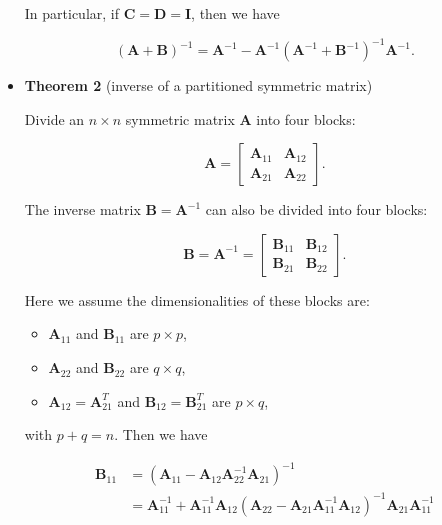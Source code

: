 \documentclass[10pt,b5paper,titlepage]{book}
\begin{document}
\begin{itemize}
        In particular, if $\mathbf{C} = \mathbf{D} = \mathbf{I}$, then we have

        \begin{equation}
            (\mathbf{A} + \mathbf{B})^{-1} = \mathbf{A}^{-1} - \mathbf{A}^{-1} (\mathbf{A}^{-1} + \mathbf{B}^{-1})^{-1} \mathbf{A}^{-1}
        .\end{equation}

    \item \textbf{Theorem 2} (inverse of a partitioned symmetric matrix)

        Divide an $n \times n$ symmetric matrix $\mathbf{A}$ into four blocks:

        \begin{equation}
            \mathbf{A} = \begin{bmatrix}
                \mathbf{A}_{11} & \mathbf{A}_{12}\\
                \mathbf{A}_{21} & \mathbf{A}_{22}
            \end{bmatrix}
        .\end{equation}

        The inverse matrix $\mathbf{B} = \mathbf{A}^{-1}$ can also be divided into four blocks:

        \begin{equation}
            \mathbf{B} = \mathbf{A}^{-1} = \begin{bmatrix}
                \mathbf{B}_{11} & \mathbf{B}_{12}\\
                \mathbf{B}_{21} & \mathbf{B}_{22}
            \end{bmatrix}
        .\end{equation}

        Here we assume the dimensionalities of these blocks are:
        \begin{itemize}
            \item $\mathbf{A}_{11}$ and $\mathbf{B}_{11}$ are $p \times p$,
            \item $\mathbf{A}_{22}$ and $\mathbf{B}_{22}$ are $q \times q$,
            \item $\mathbf{A}_{12} = \mathbf{A}_{21}^{T}$ and $\mathbf{B}_{12} = \mathbf{B}_{21}^{T}$ are $p \times q$,
        \end{itemize}
        with $p + q = n$. Then we have

         \begin{equation}
            \begin{array}{ll}
                \mathbf{B}_{11} &= (\mathbf{A}_{11} - \mathbf{A}_{12} \mathbf{A}_{22}^{-1} \mathbf{A}_{21})^{-1}\\
                       &= \mathbf{A}_{11}^{-1} + \mathbf{A}_{11}^{-1} \mathbf{A}_{12} (\mathbf{A}_{22} - \mathbf{A}_{21} \mathbf{A}_{11}^{-1} \mathbf{A}_{12})^{-1} \mathbf{A}_{21} \mathbf{A}_{11}^{-1}\\


\end{array}
\end{equation}
\end{itemize}
\end{document}
